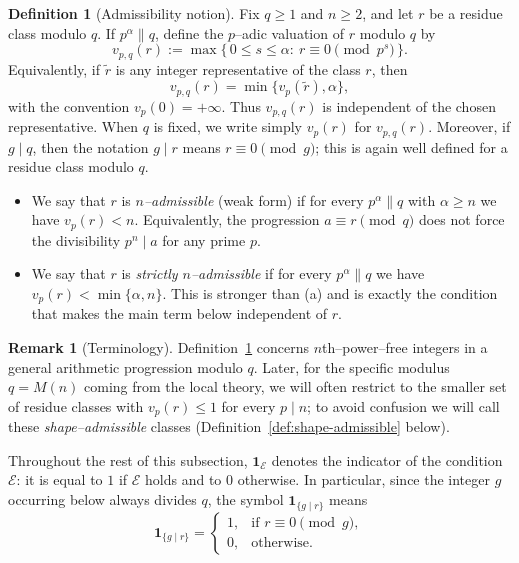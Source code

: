 \documentclass[12pt,a4paper,oneside]{amsart}
\theoremstyle{definition}
\newtheorem{definition}[theorem]{Definition}
\newtheorem{remark}[theorem]{Remark}
\begin{document}
\begin{definition}[Admissibility notion]\label{def:admissibilities}
Fix $q\ge1$ and $n\ge2$, and let $r$ be a residue class modulo $q$.  If
$p^\alpha\parallel q$, define the $p$--adic valuation of $r$ modulo $q$ by
\[
 v_{p,q}(r):=\max\{\,0\le s\le \alpha:\ r\equiv0\pmod{p^s}\,\}.
\]
Equivalently, if $\widetilde r$ is any integer representative of the class $r$, then
\[
 v_{p,q}(r)=\min\{v_p(\widetilde r),\alpha\},
\]
with the convention $v_p(0)=+\infty$.  Thus $v_{p,q}(r)$ is independent of the chosen
representative.  When $q$ is fixed, we write simply $v_p(r)$ for $v_{p,q}(r)$.
Moreover, if $g\mid q$, then the notation $g\mid r$ means $r\equiv0\pmod g$; this is again
well defined for a residue class modulo $q$.
\begin{itemize}
\item[(a)] We say that $r$ is \emph{$n$--admissible} (weak form) if for every
$p^\alpha\parallel q$ with $\alpha\ge n$ we have $v_p(r)<n$.  Equivalently, the progression
$a\equiv r\pmod q$ does not force the divisibility $p^n\mid a$ for any prime $p$.
\item[(b)] We say that $r$ is \emph{strictly $n$--admissible} if for every $p^\alpha\parallel q$
we have $v_p(r)<\min\{\alpha,n\}$.  This is stronger than (a) and is exactly the condition
that makes the main term below independent of $r$.
\end{itemize}
\end{definition}

\begin{remark}[Terminology]\label{rem:admissibility-terminology}
Definition~\ref{def:admissibilities} concerns $n$th--power--free integers in a general arithmetic progression
modulo $q$. Later, for the specific modulus $q=M(n)$ coming from the local theory, we will often restrict to the
smaller set of residue classes with $v_p(r)\le 1$ for every $p\mid n$; to avoid confusion we will call these
\emph{shape--admissible} classes (Definition~\ref{def:shape-admissible} below).
\end{remark}

Throughout the rest of this subsection, $\mathbf 1_{\mathcal E}$ denotes the indicator of the condition
$\mathcal E$: it is equal to $1$ if $\mathcal E$ holds and to $0$ otherwise.  In particular, since the integer
$g$ occurring below always divides $q$, the symbol $\mathbf 1_{\{g\mid r\}}$ means
\[
\mathbf 1_{\{g\mid r\}}=
\begin{cases}
1,&\text{if }r\equiv0\pmod g,\\
0,&\text{otherwise.}
\end{cases}
\]
\end{document}
